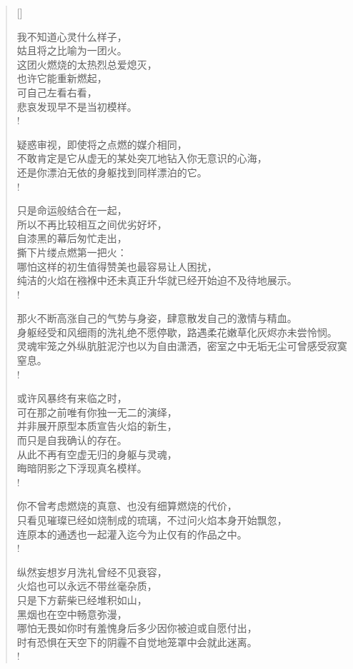 \documentclass[UTF8, 12pt, a4paper]{ctexrep} %
\begin{document}
\begin{verse}[\versewidth]

我不知道心灵什么样子，\\
姑且将之比喻为一团火。\\
这团火燃烧的太热烈总爱熄灭，\\
也许它能重新燃起，\\
可自己左看右看，\\
悲哀发现早不是当初模样。\\!

疑惑审视，即使将之点燃的媒介相同，\\
不敢肯定是它从虚无的某处突兀地钻入你无意识的心海，\\
还是你漂泊无依的身躯找到同样漂泊的它。\\!

只是命运般结合在一起，\\
所以不再比较相互之间优劣好坏，\\
自漆黑的幕后匆忙走出，\\
撕下片缕点燃第一把火：\\
哪怕这样的初生值得赞美也最容易让人困扰，\\
纯洁的火焰在襁褓中还未真正升华就已经开始迫不及待地展示。\\!

那火不断高涨自己的气势与身姿，肆意散发自己的激情与精血。\\
身躯经受和风细雨的洗礼绝不愿停歇，路遇柔花嫩草化灰烬亦未尝怜悯。\\
灵魂牢笼之外纵肮脏泥泞也以为自由潇洒，密室之中无垢无尘可曾感受寂寞窒息。\\!

或许风暴终有来临之时，\\
可在那之前唯有你独一无二的演绎，\\
并非展开原型本质宣告火焰的新生，\\
而只是自我确认的存在。\\
从此不再有空虚无归的身躯与灵魂，\\
晦暗阴影之下浮现真名模样。\\!

你不曾考虑燃烧的真意、也没有细算燃烧的代价，\\
只看见璀璨已经如烧制成的琉璃，不过问火焰本身开始飘忽，\\
连原本的通透也一起灌入迄今为止仅有的作品之中。\\!

纵然妄想岁月洗礼曾经不见衰容，\\
火焰也可以永远不带丝毫杂质，\\
只是下方薪柴已经堆积如山，\\
黑烟也在空中畅意弥漫，\\
哪怕无畏如你时有羞愧身后多少因你被迫或自愿付出，\\
时有恐惧在天空下的阴霾不自觉地笼罩中会就此迷离。\\!


\end{verse}
\end{document}
